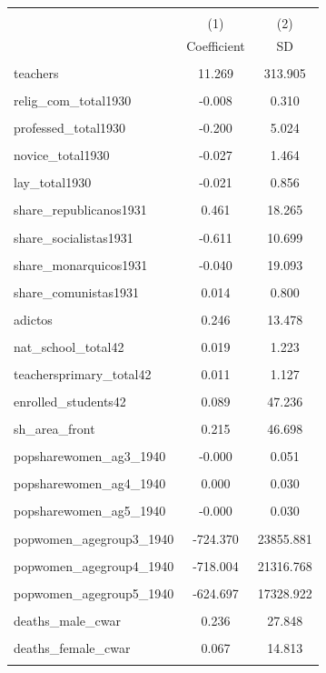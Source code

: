 \begin{tabular}{l c c }\hline\hline  \\[-0.3cm] & (1) & (2)  \\ [0.1cm] & {Coefficient} & {SD}  \\ [0.1cm] \hline \\ 
teachers &    11.269 &   313.905 \\\\
relig_com_total1930 &    -0.008 &     0.310 \\\\
professed_total1930 &    -0.200 &     5.024 \\\\
novice_total1930 &    -0.027 &     1.464 \\\\
lay_total1930 &    -0.021 &     0.856 \\\\
share_republicanos1931 &     0.461 &    18.265 \\\\
share_socialistas1931 &    -0.611 &    10.699 \\\\
share_monarquicos1931 &    -0.040 &    19.093 \\\\
share_comunistas1931 &     0.014 &     0.800 \\\\
adictos &     0.246 &    13.478 \\\\
nat_school_total42 &     0.019 &     1.223 \\\\
teachersprimary_total42 &     0.011 &     1.127 \\\\
enrolled_students42 &     0.089 &    47.236 \\\\
sh_area_front &     0.215 &    46.698 \\\\
popsharewomen_ag3_1940 &    -0.000 &     0.051 \\\\
popsharewomen_ag4_1940 &     0.000 &     0.030 \\\\
popsharewomen_ag5_1940 &    -0.000 &     0.030 \\\\
popwomen_agegroup3_1940 &  -724.370 & 23855.881 \\\\
popwomen_agegroup4_1940 &  -718.004 & 21316.768 \\\\
popwomen_agegroup5_1940 &  -624.697 & 17328.922 \\\\
deaths_male_cwar &     0.236 &    27.848 \\\\
deaths_female_cwar &     0.067 &    14.813 \\\\
\hline\hline \end{tabular}

